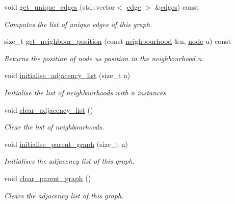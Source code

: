 \begin{DoxyCompactItemize}
\item 
void \hyperlink{classlgraph_1_1udgraph_a91ee7ee8d37197f9441a93f1e19a1f29}{get\+\_\+unique\+\_\+edges} (std\+::vector$<$ \hyperlink{namespacelgraph_a76bd7d50719f03de7a85db259d80d572}{edge} $>$ \&\hyperlink{classlgraph_1_1uxgraph_abf4c5ce2b595780e6ba80f06bdd0be16}{edges}) const
\begin{DoxyCompactList}\small\item\em Computes the list of unique edges of this graph. \end{DoxyCompactList}\item 
size\+\_\+t \hyperlink{classlgraph_1_1xxgraph_abb0c474cb162940aba3439124c1202d7}{get\+\_\+neighbour\+\_\+position} (const \hyperlink{namespacelgraph_a052e7766c13f3a43cec0aec8173fdede}{neighbourhood} \&n, \hyperlink{namespacelgraph_a397169dd66adf725210a30fb7251773e}{node} u) const
\begin{DoxyCompactList}\small\item\em Returns the position of node {\itshape u\textquotesingle{}s} position in the neighbourhood {\itshape n}. \end{DoxyCompactList}\item 
\mbox{\label{classlgraph_1_1xxgraph_a682d586f850add8b7e637aeea81b0292}} 
void \hyperlink{classlgraph_1_1xxgraph_a682d586f850add8b7e637aeea81b0292}{initialise\+\_\+adjacency\+\_\+list} (size\+\_\+t n)
\begin{DoxyCompactList}\small\item\em Initialise the list of neighbourhoods with {\itshape n} instances. \end{DoxyCompactList}\item 
\mbox{\label{classlgraph_1_1xxgraph_a6b15c62c68919722f7eb18fe273d45fe}} 
void \hyperlink{classlgraph_1_1xxgraph_a6b15c62c68919722f7eb18fe273d45fe}{clear\+\_\+adjacency\+\_\+list} ()
\begin{DoxyCompactList}\small\item\em Clear the list of neighbourhoods. \end{DoxyCompactList}\item 
void \hyperlink{classlgraph_1_1xxgraph_a50c658dd39e6b1d38bf7e514daa2f33c}{initialise\+\_\+parent\+\_\+graph} (size\+\_\+t n)
\begin{DoxyCompactList}\small\item\em Initialises the adjacency list of this graph. \end{DoxyCompactList}\item 
void \hyperlink{classlgraph_1_1xxgraph_a4122495066e4402cbf6d2d9bb82d54cc}{clear\+\_\+parent\+\_\+graph} ()
\begin{DoxyCompactList}\small\item\em Clears the adjacency list of this graph. \end{DoxyCompactList}\end{DoxyCompactItemize}
